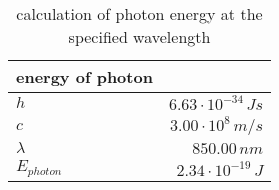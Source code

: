 \begin{table}[H]
\centering
\caption{calculation of photon energy at the specified wavelength}
\label{tab:energy_of_photon}
\begin{tabular}{|l|r|}\hline
    \textbf{energy of photon} & \\
    \hline 
    $h$ & $6.63\cdot10^{-34}\,Js$ \\
    $c$ & $3.00\cdot10^{8}\,m/s$ \\
    $\lambda$ & $850.00\,n m$ \\
    $E_{photon}$ & $2.34\cdot10^{-19}\,J$ \\
    \hline 
\end{tabular}
\end{table}
